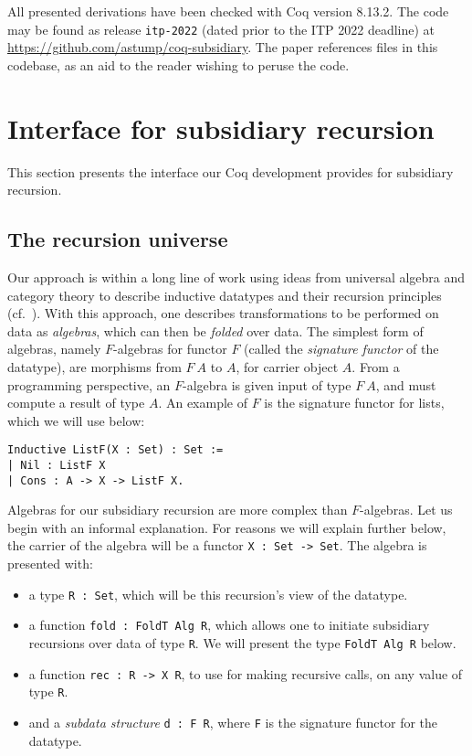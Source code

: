 \documentclass[a4paper,USenglish]{lipics-v2021}
\begin{document}
All presented derivations have been checked with Coq version 8.13.2.  The code may be
found as release \verb|itp-2022| (dated prior to the ITP 2022
deadline) at \url{https://github.com/astump/coq-subsidiary}.  The
paper references files in this codebase, as an aid to the reader
wishing to peruse the code.

\section{Interface for subsidiary recursion}
\label{sec:interface}

This section presents the interface our Coq development provides
for subsidiary recursion.

\subsection{The recursion universe}
\label{sec:recu}

Our approach is within a long line of work using ideas from universal
algebra and category theory to describe inductive datatypes and their
recursion principles (cf.~\cite{traytel12,cockett92,hagino87}).  With
this approach, one describes transformations to be performed on data
as \emph{algebras}, which can then be \textit{folded} over data.  The
simplest form of algebras, namely $F$-algebras for functor $F$ (called
the \emph{signature functor} of the datatype), are morphisms from
$F\ A$ to $A$, for carrier object $A$.  From a programming
perspective, an $F$-algebra is given input of type $F\ A$, and must
compute a result of type $A$.  An example of $F$ is the signature
functor for lists, which we will use below:

\begin{verbatim}
Inductive ListF(X : Set) : Set :=
| Nil : ListF X
| Cons : A -> X -> ListF X.
\end{verbatim}

Algebras for our subsidiary recursion are more complex than
$F$-algebras.  Let us begin with an informal explanation.  For reasons
we will explain further below, the carrier of the algebra will be a
functor \verb|X : Set -> Set|.  The algebra is presented with:

\begin{itemize}
\item a type \verb|R : Set|, which will be this recursion's view of the datatype.
\item a function \verb|fold : FoldT Alg R|, which allows one to
  initiate subsidiary recursions over data of type \verb|R|.  We will
  present the type \verb|FoldT Alg R| below.
\item a function \verb|rec : R -> X R|, to use for making recursive calls, on any value of type \verb|R|.
\item and a \emph{subdata structure} \verb|d : F R|, where \verb|F| is the signature functor for the datatype.
\end{itemize}
\end{document}
